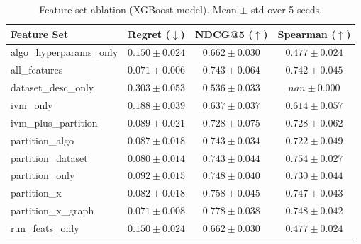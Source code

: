 \begin{table}[t]
\centering
\caption{Feature set ablation (XGBoost model). Mean $\pm$ std over 5 seeds.}
\label{tab:features}
\begin{tabular}{lccc}
\toprule
Feature Set & Regret ($\downarrow$) & NDCG@5 ($\uparrow$) & Spearman ($\uparrow$) \\
\midrule
algo\_hyperparams\_only & $0.150 \pm 0.024$ & $0.662 \pm 0.030$ & $0.477 \pm 0.024$ \\
all\_features & $0.071 \pm 0.006$ & $0.743 \pm 0.064$ & $0.742 \pm 0.045$ \\
dataset\_desc\_only & $0.303 \pm 0.053$ & $0.536 \pm 0.033$ & $nan \pm 0.000$ \\
ivm\_only & $0.188 \pm 0.039$ & $0.637 \pm 0.037$ & $0.614 \pm 0.057$ \\
ivm\_plus\_partition & $0.089 \pm 0.021$ & $0.728 \pm 0.075$ & $0.728 \pm 0.062$ \\
partition\_algo & $0.087 \pm 0.018$ & $0.743 \pm 0.034$ & $0.722 \pm 0.049$ \\
partition\_dataset & $0.080 \pm 0.014$ & $0.743 \pm 0.044$ & $0.754 \pm 0.027$ \\
partition\_only & $0.092 \pm 0.015$ & $0.748 \pm 0.040$ & $0.730 \pm 0.044$ \\
partition\_x & $0.082 \pm 0.018$ & $0.758 \pm 0.045$ & $0.747 \pm 0.043$ \\
partition\_x\_graph & $0.071 \pm 0.008$ & $0.778 \pm 0.038$ & $0.748 \pm 0.042$ \\
run\_feats\_only & $0.150 \pm 0.024$ & $0.662 \pm 0.030$ & $0.477 \pm 0.024$ \\
\bottomrule
\end{tabular}
\end{table}